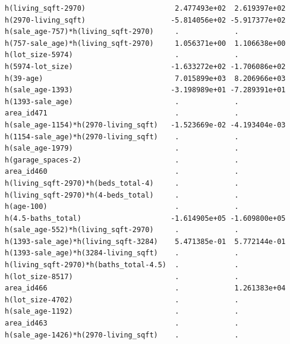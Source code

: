 \documentclass[
]{article}
\begin{document}
\begin{verbatim}
h(living_sqft-2970)                     2.477493e+02  2.619397e+02
h(2970-living_sqft)                    -5.814056e+02 -5.917377e+02
h(sale_age-757)*h(living_sqft-2970)     .             .           
h(757-sale_age)*h(living_sqft-2970)     1.056371e+00  1.106638e+00
h(lot_size-5974)                        .             .           
h(5974-lot_size)                       -1.633272e+02 -1.706086e+02
h(39-age)                               7.015899e+03  8.206966e+03
h(sale_age-1393)                       -3.198989e+01 -7.289391e+01
h(1393-sale_age)                        .             .           
area_id471                              .             .           
h(sale_age-1154)*h(2970-living_sqft)   -1.523669e-02 -4.193404e-03
h(1154-sale_age)*h(2970-living_sqft)    .             .           
h(sale_age-1979)                        .             .           
h(garage_spaces-2)                      .             .           
area_id460                              .             .           
h(living_sqft-2970)*h(beds_total-4)     .             .           
h(living_sqft-2970)*h(4-beds_total)     .             .           
h(age-100)                              .             .           
h(4.5-baths_total)                     -1.614905e+05 -1.609800e+05
h(sale_age-552)*h(living_sqft-2970)     .             .           
h(1393-sale_age)*h(living_sqft-3284)    5.471385e-01  5.772144e-01
h(1393-sale_age)*h(3284-living_sqft)    .             .           
h(living_sqft-2970)*h(baths_total-4.5)  .             .           
h(lot_size-8517)                        .             .           
area_id466                              .             1.261383e+04
h(lot_size-4702)                        .             .           
h(sale_age-1192)                        .             .           
area_id463                              .             .           
h(sale_age-1426)*h(2970-living_sqft)    .             .           
                                                                  

\end{verbatim}
\end{document}
